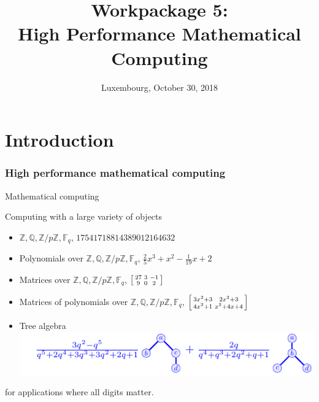 \documentclass{beamer}
\title[Workpackage 5]{Workpackage 5:\\ High Performance Mathematical Computing}
\date{Luxembourg, October 30, 2018}
\institute[ODK 2nd project review]{Second OpenDreamKit Project review}
\newenvironment{smatrix}{\left[\begin{smallmatrix}}{\end{smallmatrix}\right]}
\newcommand{\Z}{\ensuremath{\mathbb{Z}\xspace}}
\newcommand{\Q}{\ensuremath{\mathbb{Q}\xspace}}
\newcommand{\F}{\ensuremath{\mathbb{F}\xspace}}
\begin{document}
\maketitle

\section*{Introduction}

\begin{frame}
  \frametitle{High performance mathematical computing}

  \begin{block}{Mathematical computing}

    Computing with a large variety of objects
        \begin{itemize}[<+->]
        \item $\Z, \Q, \Z/p\Z, \F_q$, \hfill {\color{blue} $17541718814389012164632$}
        \item Polynomials over $\Z, \Q, \Z/p\Z, \F_q$, \hfill {\color{blue} $\frac{2}{5} x^{3} + x^{2} - \frac{1}{19} x + 2$}
        \item Matrices over $\Z, \Q, \Z/p\Z, \F_q$, \hfill
           {\color{blue} $\begin{smatrix} 27&3&-1\\ 9&0& 2 \end{smatrix} $}
        \item Matrices of polynomials over $\Z, \Q, \Z/p\Z, \F_q$, \hfill
          {\color{blue} $ \begin{smatrix}
            3 x^{2} + 3 & 2 x^{2} + 3 \\4 x^{2} + 1 & x^{2} + 4 x + 4
          \end{smatrix}$}
        \item Tree algebra \hfill
      \includegraphics[width=.7\textwidth]{Pictures/operade}
        \end{itemize}

        for applications where all digits matter.

  \end{block}
\end{frame}
\end{document}
